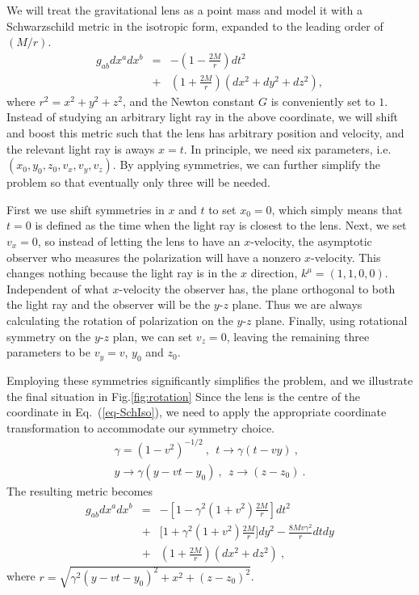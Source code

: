 \documentclass[aps,showpacs,twocolumn,floats,prd,superscriptaddress,nofootinbib]{revtex4-1}
\begin{document}
We will treat the gravitational lens as a point mass and model it with a Schwarzschild metric in the isotropic form, expanded to the leading order of $(M/r)$. 
\begin{eqnarray}
g_{ab}dx^adx^b &=& -\left(1-\frac{2M}{r}\right)dt^2 \\ \nonumber
&+& \left(1+\frac{2M}{r}\right)  \left(dx^2+dy^2+dz^2\right), 
\label{eq-SchIso}
\end{eqnarray}
where  $r^2 = x^2 + y^2 + z^2$,  and the Newton constant $G$ is conveniently set to $1$.
Instead of studying an arbitrary light ray in the above coordinate, we will shift and boost this metric such that the lens has arbitrary position and velocity, and the relevant light ray is aways $x=t$.
In principle, we need six parameters, i.e. $(x_0,y_0,z_0,v_x,v_y,v_z)$. 
By applying symmetries, we can further simplify the problem so that eventually only three will be needed. 

First we use shift symmetries in $x$ and $t$ to set $x_0=0$, which simply means that $t=0$ is defined as the time when the light ray is closest to the lens. 
Next, we set $v_x=0$, so instead of letting the lens to have an $x$-velocity, the asymptotic observer who measures the polarization will have a nonzero $x$-velocity. 
This changes nothing because the light ray is in the $x$ direction, $k^\mu = (1,1,0,0)$.
Independent of what $x$-velocity the observer has, the plane orthogonal to both the light ray and the observer will be the $y$-$z$ plane.
Thus we are always calculating the rotation of polarization on the $y$-$z$ plane.
Finally, using rotational symmetry on the $y$-$z$ plan, we can set $v_z=0$, leaving the remaining three parameters to be $v_y=v$, $y_0$ and $z_0$. 

Employing these symmetries significantly simplifies the problem, and we illustrate the final situation in Fig.\ref{fig:rotation}
Since the lens is the centre of the coordinate in Eq.~(\ref{eq-SchIso}), we need to apply the appropriate coordinate transformation to accommodate our symmetry choice. 
\begin{eqnarray}
\gamma = (1-v^2)^{-1/2}~, \ \ t \rightarrow \gamma(t-vy)~, \nonumber \\
 y\rightarrow \gamma(y-vt-y_0)~, \ \ z\rightarrow (z-z_0)~.
\end{eqnarray}
The resulting metric becomes
\begin{eqnarray}
\label{eq-metric}
g_{ab}dx^adx^b &=& -\left[1-\gamma^2(1+v^2)\frac{2M}{r}\right]dt^2   
\nonumber \\
&+& \biggl [1  +  \gamma^2(1+v^2)\frac{2M}{r} \biggr]dy^2 
- \frac{8Mv\gamma^2}{r}dtdy  \nonumber \\
&+& \left(1+\frac{2M}{r}\right)(dx^2+dz^2)~,
\end{eqnarray}
where $r = \sqrt{ \gamma^2(y-vt-y_0)^2 + x^2 + (z-z_0)^2 }$. 
\end{document}
